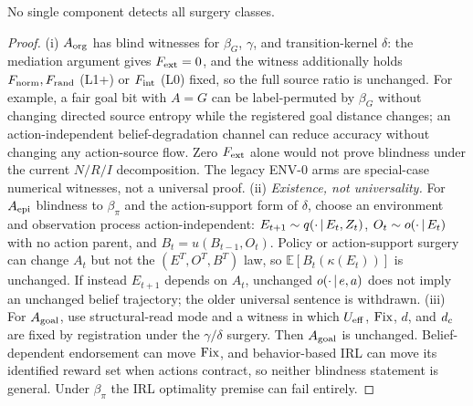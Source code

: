 \begin{proposition}
No single component detects all surgery classes.
\end{proposition}
\begin{proof}
(i) $A_{\mathrm{org}}$ has blind witnesses for $\beta_G$, $\gamma$, and
transition-kernel $\delta$: the mediation argument gives $F_{\mathrm{ext}}=0$, and the
witness additionally holds $F_{\mathrm{norm}},F_{\mathrm{rand}}$ (L1+) or $F_{\mathrm{int}}$ (L0) fixed, so the
full source ratio is unchanged. For example, a fair goal bit with $A=G$ can be
label-permuted by $\beta_G$ without changing directed source entropy while the
registered goal distance changes; an action-independent belief-degradation
channel can reduce accuracy without changing any action-source flow. Zero
$F_{\mathrm{ext}}$ alone would not prove blindness under the current $N/R/I$ decomposition.
The legacy ENV-0 arms are special-case numerical witnesses, not a universal
proof.
(ii) \emph{Existence, not universality.} For $A_{\mathrm{epi}}$ blindness to
$\beta_\pi$ and the action-support form of $\delta$, choose an environment and
observation process action-independent: $E_{t+1}\sim q(\cdot\,|\, E_t,Z_t)$,
$O_t\sim o(\cdot\,|\, E_t)$ with no action parent, and
$B_t=u(B_{t-1},O_t)$. Policy or action-support surgery can change $A_t$ but
not the $(E^T,O^T,B^T)$ law, so $\mathbb E[B_t(\kappa(E_t))]$ is unchanged.
If instead $E_{t+1}$ depends on $A_t$, unchanged $o(\cdot\,|\, e,a)$ does not
imply an unchanged belief trajectory; the older universal sentence is
withdrawn. (iii) For $A_{\mathrm{goal}}$, use structural-read mode and a witness in which
$U_{\mathrm{eff}}$, $\mathrm{Fix}$, $d$, and $d_{c}$ are fixed by registration under the
$\gamma/\delta$ surgery. Then $A_{\mathrm{goal}}$ is unchanged. Belief-dependent
endorsement can move $\mathrm{Fix}$, and behavior-based IRL can move its identified
reward set when actions contract, so neither blindness statement is general.
Under $\beta_\pi$ the IRL optimality premise can fail entirely.
\end{proof}

